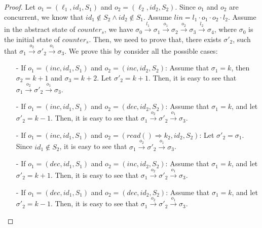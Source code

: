 {\begin {proof}
Let $o_1 = (\ell_1,\mathit{id}_1,S_1)$ and $o_2 = (\ell_2,\mathit{id}_2,S_2)$. Since $o_1$ and $o_2$ are concurrent, we know that $\mathit{id}_1 \notin S_2 \wedge \mathit{id}_2 \notin S_1$. Assume $\mathit{lin} = l_1 \cdot o_1 \cdot o_2 \cdot l_2$. Assume in the abstract state of $\mathit{counter}_s$, we have $\sigma_0 {\xrightarrow{l_1}} \sigma_1 {\xrightarrow{o_1}} \sigma_2 {\xrightarrow{o_2}} \sigma_3 {\xrightarrow{l_2}} \sigma_4$, where $\sigma_0$ is the initial state of $\mathit{counter}_s$. Then, we need to prove that, there exists $\sigma'_2$, such that $\sigma_1 {\xrightarrow{o_2}} \sigma'_2 {\xrightarrow{o_1}} \sigma_3$. We prove this by consider all the possible cases:

\begin{itemize}
\setlength{\itemsep}{0.5pt}
\item[-] If $o_1 = (\mathit{inc},\mathit{id}_1,S_1)$ and $o_2 = (\mathit{inc},\mathit{id}_2,S_2)$: Assume that $\sigma_1 = k$, then $\sigma_2 = \mathit{k+1}$ and $\sigma_3 = \mathit{k+2}$. Let $\sigma'_2 = \mathit{k+1}$. Then, it is easy to see that $\sigma_1 {\xrightarrow{o_2}} \sigma'_2 {\xrightarrow{o_1}} \sigma_3$.

\item[-] If $o_1 = (\mathit{inc},\mathit{id}_1,S_1)$ and $o_2 = (\mathit{dec},\mathit{id}_2,S_2)$: Assume that $\sigma_1 = k$, and let $\sigma'_2 = \mathit{k-1}$. Then, it is easy to see that $\sigma_1 {\xrightarrow{o_2}} \sigma'_2 {\xrightarrow{o_1}} \sigma_3$.

\item[-] If $o_1 = (\mathit{inc},\mathit{id}_1,S_1)$ and $o_2 = (\mathit{read}() \Rightarrow k_2,\mathit{id}_2,S_2)$: Let $\sigma'_2 = \sigma_1$. Since $\mathit{id}_1 \notin S_2$, it is easy to see that $\sigma_1 {\xrightarrow{o_2}} \sigma'_2 {\xrightarrow{o_1}} \sigma_3$.

\item[-] If $o_1 = (\mathit{dec},\mathit{id}_1,S_1)$ and $o_2 = (\mathit{inc},\mathit{id}_2,S_2)$: Assume that $\sigma_1 = k$, and let $\sigma'_2 = \mathit{k+1}$. Then, it is easy to see that $\sigma_1 {\xrightarrow{o_2}} \sigma'_2 {\xrightarrow{o_1}} \sigma_3$.

\item[-] If $o_1 = (\mathit{dec},\mathit{id}_1,S_1)$ and $o_2 = (\mathit{dec},\mathit{id}_2,S_2)$: Assume that $\sigma_1 = k$, and let $\sigma'_2 = \mathit{k-1}$. Then, it is easy to see that $\sigma_1 {\xrightarrow{o_2}} \sigma'_2 {\xrightarrow{o_1}} \sigma_3$.


\end{itemize}
\end{proof}}
